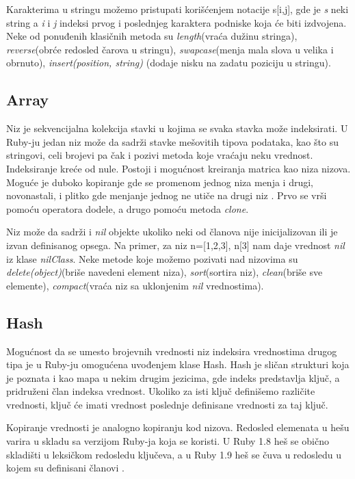 \documentclass[a4paper]{article}
\begin{document}
Karakterima u stringu možemo pristupati korišćenjem notacije s[i,j], gde je \emph{s} neki string a \emph{i} i \emph{j} indeksi prvog i poslednjeg karaktera podniske koja će biti izdvojena. Neke od ponuđenih klasičnih metoda su \emph{length}(vraća dužinu stringa), \emph{reverse}(obrće redosled čarova u stringu), \emph{swapcase}(menja mala slova u velika i obrnuto), \emph{insert(position, string)} (dodaje nisku na zadatu poziciju u stringu).

\subsection{Array}
Niz je sekvencijalna kolekcija stavki u kojima se svaka stavka može indeksirati. U Ruby-ju jedan niz može da sadrži stavke mešovitih tipova podataka, kao što su stringovi, celi brojevi pa čak i pozivi metoda koje vraćaju neku vrednost. Indeksiranje kreće od nule. Postoji i mogućnost kreiranja matrica kao niza nizova. Moguće je duboko kopiranje gde se promenom jednog niza menja i drugi, novonastali, i plitko gde menjanje jednog ne utiče na drugi niz \cite {HandsOn}. Prvo se vrši pomoću operatora dodele, a drugo pomoću metoda \emph{clone}. 

Niz može da sadrži i \emph{nil} objekte ukoliko neki od članova nije inicijalizovan ili je izvan definisanog opsega. Na primer, za niz n=[1,2,3], n[3]  nam daje vrednost \emph{nil} iz klase \emph{nilClass}. Neke metode koje možemo pozivati nad nizovima su \emph{delete(object)}(briše navedeni element niza), \emph{sort}(sortira niz), \emph{clean}(briše sve elemente), \emph{compact}(vraća niz sa uklonjenim \emph{nil} vrednostima).

\subsection{Hash}
Mogućnost da se umesto brojevnih vrednosti niz indeksira vrednostima drugog tipa je u Ruby-ju omogućena uvođenjem klase Hash. Hash je sličan strukturi koja je poznata i kao mapa u nekim drugim jezicima, gde indeks predstavlja ključ, a pridruženi član indeksa vrednost. Ukoliko za isti ključ definišemo različite vrednosti, ključ će imati vrednost poslednje definisane vrednosti za taj ključ. 

Kopiranje vrednosti je analogno kopiranju kod nizova. Redosled elemenata u hešu varira u skladu sa verzijom Ruby-ja koja se koristi. U Ruby 1.8 heš se obično skladišti u leksičkom redosledu ključeva, a u Ruby 1.9 heš se čuva u redosledu u kojem su definisani članovi \cite{HandsOn}.
\end{document}
